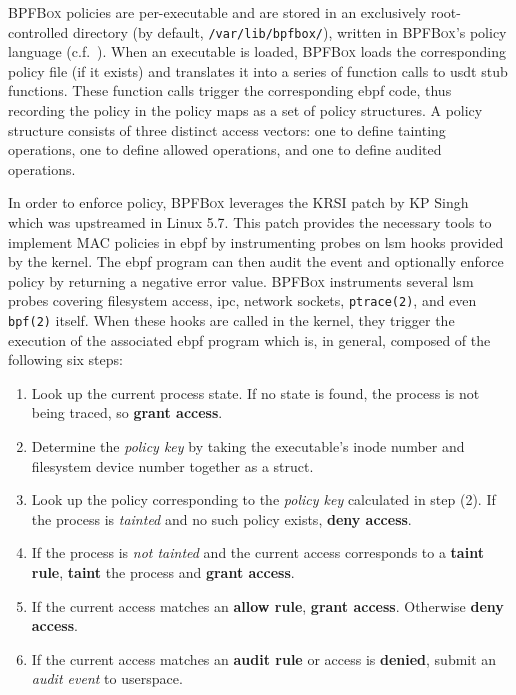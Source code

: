 \documentclass[
  fontsize=12pt,
  titlepage=firstiscover,
  paper=letter,
oneside,
  cleardoublepage=plain,
  parskip=half-,
  DIV=10,
  parindent,
  appendixprefix,
  chapterprefix,
  listof=totoc,
]{scrbook}
\newcommand{\bpfbox}{\textsc{BPFBox}}
\begin{document}
\bpfbox{} policies are per-executable and are stored in an exclusively root-controlled
directory (by default, \texttt{/var/lib/bpfbox/}), written in \bpfbox{}'s policy language
(c.f.\ ). When an executable is loaded, \bpfbox{} loads the corresponding
policy file (if it exists) and translates it into a series of function calls to \gls{usdt}
stub functions.  These function calls trigger the corresponding \gls{ebpf} code, thus recording
the policy in the policy maps as a set of policy structures.  A policy structure consists
of three distinct access vectors: one to define tainting operations, one to define allowed
operations, and one to define audited operations.

In order to enforce policy, \bpfbox{} leverages the KRSI patch by KP
Singh~\cite{singh2019_krsi, corbet2019_krsi} which was upstreamed in Linux
5.7. This patch provides the necessary tools to implement MAC policies in \gls{ebpf} by
instrumenting probes on \gls{lsm} hooks provided by the kernel. The \gls{ebpf} program can then
audit the event and optionally enforce policy by returning a negative error value.
\bpfbox{} instruments several \gls{lsm} probes covering filesystem access, \gls{ipc}, network
sockets, \texttt{ptrace(2)}, and even \texttt{bpf(2)} itself.  When these hooks are
called in the kernel, they trigger the execution of the associated \gls{ebpf} program which
is, in general, composed of the following six steps:
\begin{enumerate}
\item Look up the current process state.  If no state is found, the process is
      not being traced, so \textbf{grant access}.
\item Determine the \textit{policy key} by taking the executable's inode
      number and filesystem device number together as a struct.
\item Look up the policy corresponding to the \textit{policy key} calculated in step (2). If the
      process is \textit{tainted} and no such policy exists, \textbf{deny access}.
\item If the process is \textit{not tainted} and the current access corresponds to
      a \textbf{taint rule}, \textbf{taint} the process and \textbf{grant access}.
\item If the current access matches an \textbf{allow rule}, \textbf{grant access}.
      Otherwise \textbf{deny access}.
\item If the current access matches an \textbf{audit rule} or access is \textbf{denied},
      submit an \textit{audit event} to userspace.
\end{enumerate}
\end{document}
